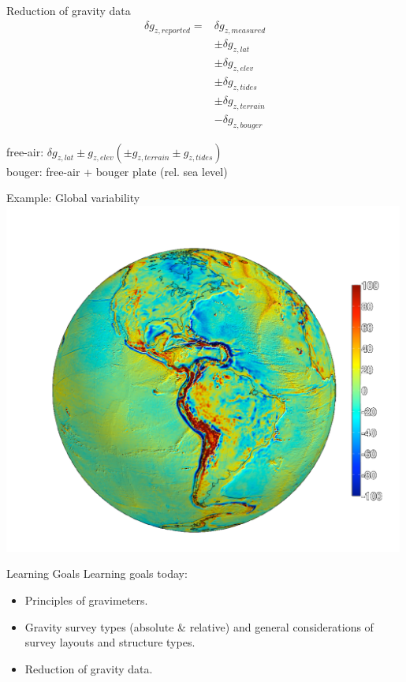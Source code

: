 \begin{frame}
  \begin{PointSix}{Reduction of gravity data}
    \begin{align*}
        \delta g_{z, reported} = &\delta g_{z, measured} \\
        &\pm \delta g_{z, lat}   \\
        &\pm \delta g_{z, elev}  \\
        &\pm \delta g_{z, tides}  \\
        &\pm \delta g_{z,terrain} \\ 
        &- \delta g_{z,bouger} 
  \end{align*}

  \small free-air: $\delta g_{z, lat} \pm g_{z, elev} (\pm  g_{z,terrain} \pm g_{z, tides})$\\
  
  \small bouger: free-air + bouger plate (rel. sea level)


  \end{PointSix}
\end{frame}


\begin{frame}
  \begin{PointSix}{Example: Global variability}
      \includegraphics[width=0.99\textwidth]{Figures/Gravity/Exported/Grace_JPLCaltect_FODT10_WithoutPeople.png}
  \end{PointSix}
\end{frame}

\begin{frame}
  \begin{PointSix}{Learning Goals}
    \alert{Learning goals today:}
    \begin{itemize}
      \item Principles of gravimeters.
      \item Gravity survey types (absolute \& relative) and general considerations of survey layouts and structure types.
      \item Reduction of gravity data.
    \end{itemize}
  \end{PointSix}
\end{frame}